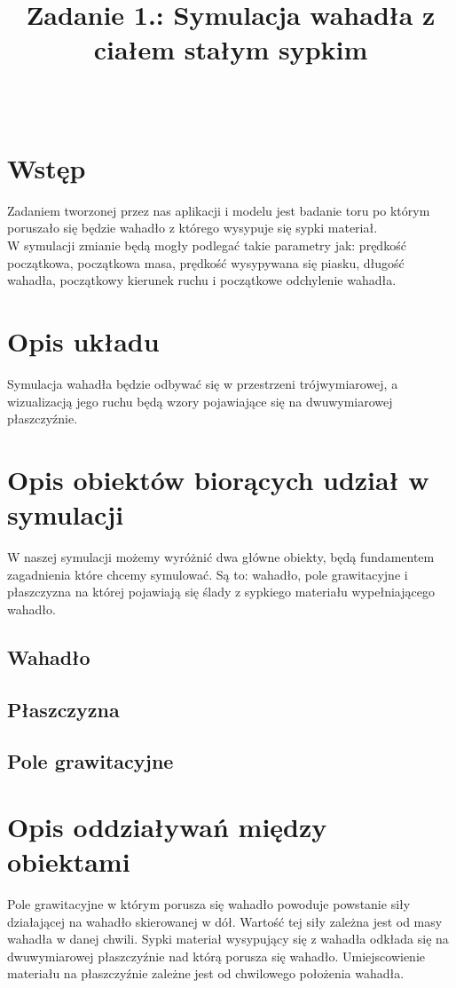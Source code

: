 \documentclass{classrep}
\author{%
  \studentinfo[210347@edu.p.lodz.pl]{Krzysztof Wierzbicki}{210347}\\
  \studentinfo[210209@edu.p.lodz.pl]{Bartosz Jurczewski}{210209}%
}
\title{Zadanie 1.: Symulacja wahadła z ciałem stałym sypkim }
\begin{document}
\maketitle
\thispagestyle{fancyplain}

\newpage

\section{Wstęp}
Zadaniem tworzonej przez nas aplikacji i modelu jest badanie toru po którym poruszało się będzie wahadło z którego wysypuje się sypki materiał. \\
W symulacji zmianie będą mogły podlegać takie parametry jak: prędkość początkowa, początkowa masa, prędkość wysypywana się piasku, długość wahadła, początkowy kierunek ruchu i początkowe odchylenie wahadła.

\section{Opis układu}
Symulacja wahadła będzie odbywać się w przestrzeni trójwymiarowej, a wizualizacją jego ruchu będą wzory pojawiające się na dwuwymiarowej płaszczyźnie. 

\section{Opis obiektów biorących udział w symulacji}
W naszej symulacji możemy wyróżnić dwa główne obiekty, będą fundamentem zagadnienia które chcemy symulować. Są to: wahadło, pole grawitacyjne i płaszczyzna na której pojawiają się ślady z sypkiego materiału wypełniającego wahadło.

\subsection{Wahadło}

\subsection{Płaszczyzna}

\subsection{Pole grawitacyjne}

\section{Opis oddziaływań między obiektami}
Pole grawitacyjne w którym porusza się wahadło powoduje powstanie siły działającej na wahadło skierowanej w dół. Wartość tej siły zależna jest od masy wahadła w danej chwili. Sypki materiał wysypujący się z wahadła odkłada się na dwuwymiarowej płaszczyźnie nad którą porusza się wahadło. Umiejscowienie materiału na płaszczyźnie zależne jest od chwilowego położenia wahadła.  
\end{document}

